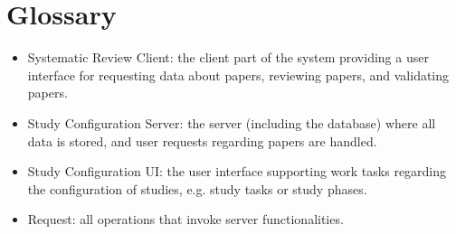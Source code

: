 \section{Glossary}

\begin{itemize}

\item Systematic Review Client: the client part of the system providing a user interface for requesting data about papers, reviewing papers, and validating papers.
\item Study Configuration Server: the server (including the database) where all data is stored, and user requests regarding papers are handled.
\item Study Configuration UI: the user interface supporting work tasks regarding the configuration of studies, e.g. study tasks or study phases. 
\item Request: all operations that invoke server functionalities. 
\end{itemize}